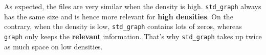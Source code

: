 \documentclass{article}
\begin{document}
As expected, the files are very similar when the density is high.
\texttt{std\_graph} always has the same size and is hence more relevant
for \textbf{high densities}. On the contrary, when the density is low,
\texttt{std\_graph} contains lots of zeros, whereas \texttt{graph} only
keeps the \textbf{relevant} information. That's why \texttt{std\_graph}
takes up twice as much space on low densities.
\end{document}
